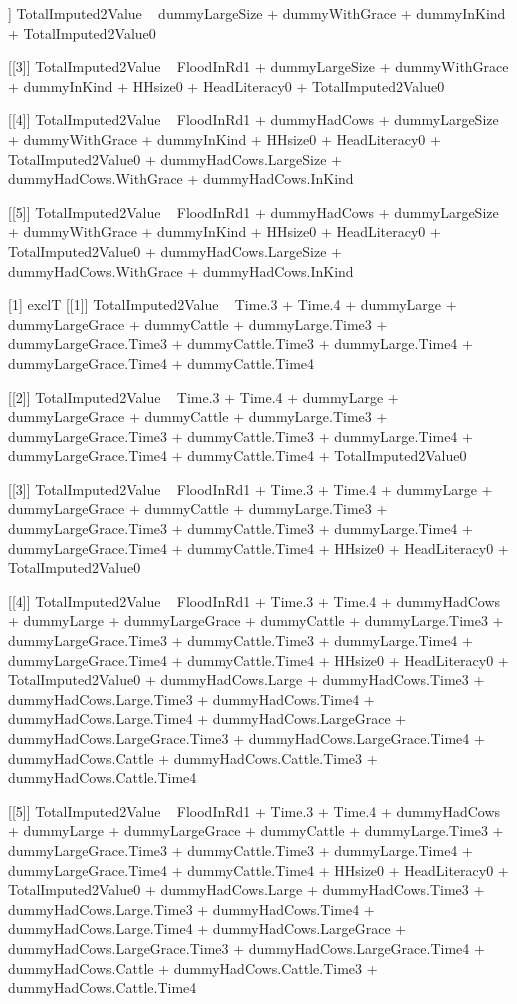 \begin{Schunk}
\begin{Soutput}
[[2]]
TotalImputed2Value ~ dummyLargeSize + dummyWithGrace + dummyInKind + 
    TotalImputed2Value0

[[3]]
TotalImputed2Value ~ FloodInRd1 + dummyLargeSize + dummyWithGrace + 
    dummyInKind + HHsize0 + HeadLiteracy0 + TotalImputed2Value0

[[4]]
TotalImputed2Value ~ FloodInRd1 + dummyHadCows + dummyLargeSize + 
    dummyWithGrace + dummyInKind + HHsize0 + HeadLiteracy0 + 
    TotalImputed2Value0 + dummyHadCows.LargeSize + dummyHadCows.WithGrace + 
    dummyHadCows.InKind

[[5]]
TotalImputed2Value ~ FloodInRd1 + dummyHadCows + dummyLargeSize + 
    dummyWithGrace + dummyInKind + HHsize0 + HeadLiteracy0 + 
    TotalImputed2Value0 + dummyHadCows.LargeSize + dummyHadCows.WithGrace + 
    dummyHadCows.InKind

[1] exclT
[[1]]
TotalImputed2Value ~ Time.3 + Time.4 + dummyLarge + dummyLargeGrace + 
    dummyCattle + dummyLarge.Time3 + dummyLargeGrace.Time3 + 
    dummyCattle.Time3 + dummyLarge.Time4 + dummyLargeGrace.Time4 + 
    dummyCattle.Time4

[[2]]
TotalImputed2Value ~ Time.3 + Time.4 + dummyLarge + dummyLargeGrace + 
    dummyCattle + dummyLarge.Time3 + dummyLargeGrace.Time3 + 
    dummyCattle.Time3 + dummyLarge.Time4 + dummyLargeGrace.Time4 + 
    dummyCattle.Time4 + TotalImputed2Value0

[[3]]
TotalImputed2Value ~ FloodInRd1 + Time.3 + Time.4 + dummyLarge + 
    dummyLargeGrace + dummyCattle + dummyLarge.Time3 + dummyLargeGrace.Time3 + 
    dummyCattle.Time3 + dummyLarge.Time4 + dummyLargeGrace.Time4 + 
    dummyCattle.Time4 + HHsize0 + HeadLiteracy0 + TotalImputed2Value0

[[4]]
TotalImputed2Value ~ FloodInRd1 + Time.3 + Time.4 + dummyHadCows + 
    dummyLarge + dummyLargeGrace + dummyCattle + dummyLarge.Time3 + 
    dummyLargeGrace.Time3 + dummyCattle.Time3 + dummyLarge.Time4 + 
    dummyLargeGrace.Time4 + dummyCattle.Time4 + HHsize0 + HeadLiteracy0 + 
    TotalImputed2Value0 + dummyHadCows.Large + dummyHadCows.Time3 + 
    dummyHadCows.Large.Time3 + dummyHadCows.Time4 + dummyHadCows.Large.Time4 + 
    dummyHadCows.LargeGrace + dummyHadCows.LargeGrace.Time3 + 
    dummyHadCows.LargeGrace.Time4 + dummyHadCows.Cattle + dummyHadCows.Cattle.Time3 + 
    dummyHadCows.Cattle.Time4

[[5]]
TotalImputed2Value ~ FloodInRd1 + Time.3 + Time.4 + dummyHadCows + 
    dummyLarge + dummyLargeGrace + dummyCattle + dummyLarge.Time3 + 
    dummyLargeGrace.Time3 + dummyCattle.Time3 + dummyLarge.Time4 + 
    dummyLargeGrace.Time4 + dummyCattle.Time4 + HHsize0 + HeadLiteracy0 + 
    TotalImputed2Value0 + dummyHadCows.Large + dummyHadCows.Time3 + 
    dummyHadCows.Large.Time3 + dummyHadCows.Time4 + dummyHadCows.Large.Time4 + 
    dummyHadCows.LargeGrace + dummyHadCows.LargeGrace.Time3 + 
    dummyHadCows.LargeGrace.Time4 + dummyHadCows.Cattle + dummyHadCows.Cattle.Time3 + 
    dummyHadCows.Cattle.Time4


\end{Soutput}
\end{Schunk}
